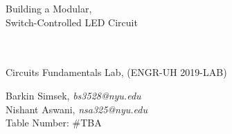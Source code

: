 \documentclass[journal]{IEEEtran}
\begin{document}
\begin{titlepage}
    {\centering
        \vspace*{20em}
        {
        \huge 
        \begin{spacing}{1.5}
            Building a Modular, \\Switch-Controlled
            LED Circuit

            
            \\
            \\
            \bigskip
            \large
            Circuits Fundamentals Lab, (ENGR-UH 2019-LAB)
        \end{spacing}

        }
        
    }
    \vfill
    
    {
    \large
    
    \begin{spacing}{1.5}
    \noindent Barkin Simsek, {\it {bs3528@nyu.edu}} 
    \\
    Nishant Aswani, {\it {nsa325@nyu.edu}}
    \\
    Table Number: \#TBA%
    \end{spacing}
    }


\end{titlepage}
\clearpage\mbox{}
\clearpage
{}
\setcounter{page}{1}




%
{}


\begin{abstract}
In this experiment a switch controlled LED circuit was built using a $330 \ohm$ resistor, as a visual indicator for the on/off status for a radio receiver to be implemented later. Calculations were carried out to confirm that the resistor value used was appropriate. A simulation was also run for further confirmation. Finally, the circuit was assembled by soldering components onto a prototype board and testing by applying a 9V source.
\end{abstract}
\end{document}
